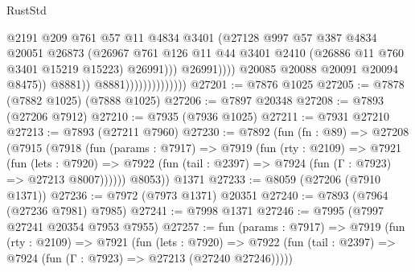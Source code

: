 \begin{lexlean}{RustStd}
\begin{coremodule}
                                                  @2191
                                                  @209
                                                  @761
                                                  @57
                                                  @11
                                                  @4834
                                                  @3401
                                                  (@27128
                                                    @997
                                                    @57
                                                    @387
                                                    @4834
                                                    @20051
                                                    @26873
                                                    (@26967
                                                      @761
                                                      @126
                                                      @11
                                                      @44
                                                      @3401
                                                      @2410
                                                      (@26886 @11 @760 @3401 @15219 @15223)
                                                      @26991)))
                                                @26991))))
                                        @20085
                                        @20088
                                        @20091
                                        @20094
                                        @8475))
                                    @8881))
                                @8881))))))))))))))
@27201 := @7876 @1025
@27205 := @7878 (@7882 @1025) (@7888 @1025)
@27206 := @7897 @20348
@27208 := @7893 (@27206 @7912)
@27210 := @7935 (@7936 @1025)
@27211 := @7931 @27210
@27213 := @7893 (@27211 @7960)
@27230 := @7892
    (fun (fn : @89) =>
    @27208
      (@7915
        (@7918
          (fun (params : @7917) =>
          @7919
            (fun (rty : @2109) =>
            @7921
              (fun (lets : @7920) =>
              @7922 (fun (tail : @2397) => @7924 (fun (Γ : @7923) => @27213 @8007))))))
        @8053))
    @1371
@27233 := @8059 (@27206 (@7910 @1371))
@27236 := @7972 (@7973 @1371) @20351
@27240 := @7893 (@7964 (@27236 @7981) @7985)
@27241 := @7998 @1371
@27246 := @7995 (@7997 @27241 @20354 @7953 @7955)
@27257 := fun (params : @7917) =>
  @7919
    (fun (rty : @2109) =>
    @7921
      (fun (lets : @7920) =>
      @7922 (fun (tail : @2397) => @7924 (fun (Γ : @7923) => @27213 (@27240 @27246)))))

\end{coremodule}
\end{lexlean}
